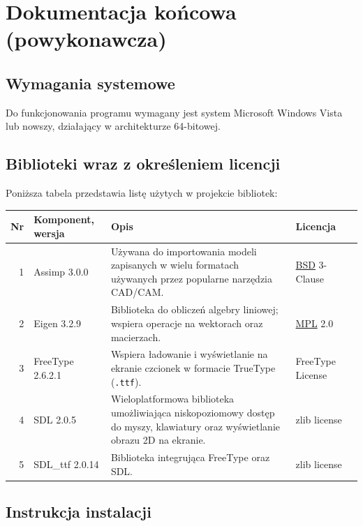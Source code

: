 \documentclass[10pt,a4paper]{article}
\begin{document}
\newpage

\section{Dokumentacja końcowa (powykonawcza)}

\subsection{Wymagania systemowe}

Do funkcjonowania programu wymagany jest system Microsoft Windows Vista lub nowszy, działający w architekturze 64-bitowej.

\subsection{Biblioteki wraz z określeniem licencji}

Poniższa tabela przedstawia listę użytych w projekcie bibliotek:

\begin{table}[H]
	\begin{tabularx}{\textwidth}{|r|l|X|l|c|}
		\hline
		\textbf{Nr} & \textbf{Komponent, wersja} & \textbf{Opis} & \textbf{Licencja} & \\
		\hline
		1 &
		Assimp 3.0.0 &
		Używana do importowania modeli zapisanych w wielu formatach używanych przez popularne narzędzia CAD/CAM. &
		\mbox{\hyperref[abbr:bsd]{BSD}} 3-Clause &
		\cite{assimp} \\
		\hline
		2 &
		Eigen 3.2.9 &
		Biblioteka do obliczeń algebry liniowej; wspiera operacje na wektorach oraz macierzach. &
		\mbox{\hyperref[abbr:mpl]{MPL}} 2.0 &
		\cite{eigen} \\
		\hline
		3 &
		FreeType 2.6.2.1 &
		Wspiera ładowanie i wyświetlanie na ekranie czcionek w formacie TrueType (\texttt{.ttf}). &
		FreeType License &
		\cite{freetype} \\
		\hline
		4 &
		SDL 2.0.5 &
		Wieloplatformowa biblioteka umożliwiająca niskopoziomowy dostęp do myszy, klawiatury oraz wyświetlanie obrazu 2D na ekranie. &
		zlib license &
		\cite{sdl} \\
		\hline
		5 &
		SDL\_ttf 2.0.14 &
		Biblioteka integrująca FreeType oraz SDL. &
		zlib license &
		\cite{sdl_ttf} \\
		\hline
	\end{tabularx}
\end{table}

\subsection{Instrukcja instalacji}
\end{document}
